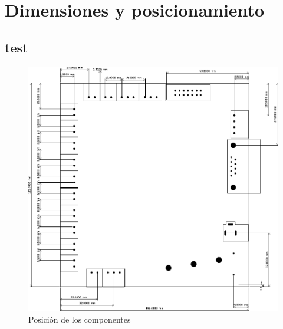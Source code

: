 \documentclass{reporti}
\begin{document}
\cover[width=1.35\textwidth][continue]

\section{Dimensiones y posicionamiento}
\subsection{test}
\begin{figure}[h]
  \centering
  \includegraphics[scale=1]{PCB_dimensiones.pdf}
  \caption{Posición de los componentes}
\end{figure}
\end{document}
